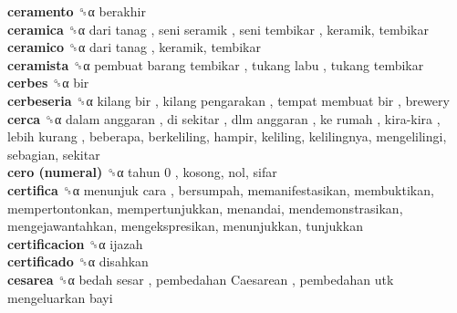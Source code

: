\textbf{ceramento} ␝α  berakhir  \\
\textbf{ceramica} ␝α   dari tanag ,  seni seramik ,  seni tembikar , keramik, tembikar  \\
\textbf{ceramico} ␝α   dari tanag , keramik, tembikar  \\
\textbf{ceramista} ␝α   pembuat barang tembikar ,  tukang labu ,  tukang tembikar   \\
\textbf{cerbes} ␝α  bir  \\
\textbf{cerbeseria} ␝α   kilang bir ,  kilang pengarakan ,  tempat membuat bir , brewery  \\
\textbf{cerca} ␝α   dalam anggaran ,  di sekitar ,  dlm anggaran ,  ke rumah ,  kira-kira ,  lebih kurang , beberapa, berkeliling, hampir, keliling, kelilingnya, mengelilingi, sebagian, sekitar  \\
\textbf{cero (numeral)} ␝α   tahun 0 , kosong, nol, sifar  \\
\textbf{certifica} ␝α   menunjuk cara , bersumpah, memanifestasikan, membuktikan, mempertontonkan, mempertunjukkan, menandai, mendemonstrasikan, mengejawantahkan, mengekspresikan, menunjukkan, tunjukkan  \\
\textbf{certificacion} ␝α  ijazah  \\
\textbf{certificado} ␝α  disahkan  \\
\textbf{cesarea} ␝α   bedah sesar ,  pembedahan Caesarean ,  pembedahan utk mengeluarkan bayi   \\
